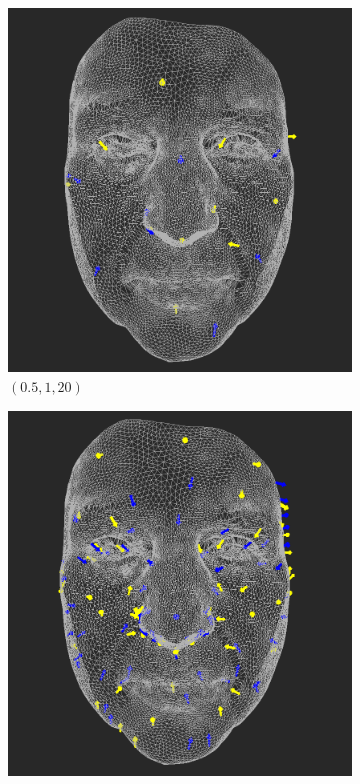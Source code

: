 \begin{figure}[h]
    \begin{subfigure}{0.4\textwidth}
	\includegraphics[width=\textwidth]{./img/meshdiff-arrows-interval0_5-1-count20-single.png}
    \caption{\((0.5,1,20)\)}
    \label{fig:meshdiff-arrows_1-20}
	\end{subfigure}
    \qquad
    \begin{subfigure}{0.4\textwidth}
	\includegraphics[width=\textwidth]{./img/meshdiff-arrows-interval0_5-1-count125-single.png}

\end{subfigure}
\end{figure}
